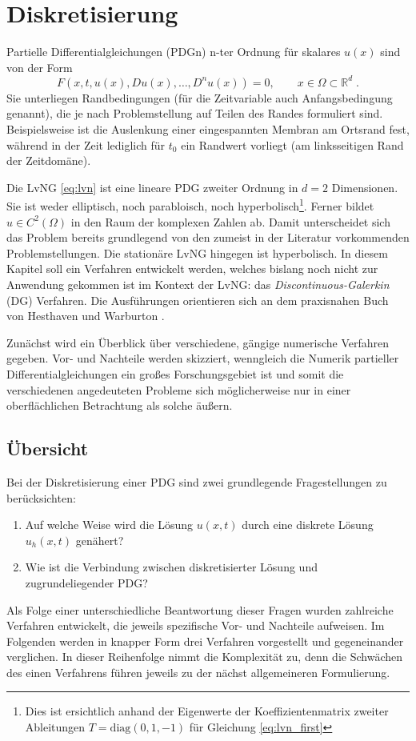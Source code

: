 \chapter{Diskretisierung}

Partielle Differentialgleichungen (PDGn) n-ter Ordnung für skalares $u(x)$ sind von der Form
\begin{equation}
  F(x, t, u(x), Du(x), \dots, D^nu(x))=0, \qquad x\in\Omega\subset\mathbb{R}^d \; .
\end{equation}
Sie unterliegen Randbedingungen (für die Zeitvariable auch Anfangsbedingung genannt), die je nach Problemstellung auf Teilen des Randes formuliert sind. Beispielsweise ist die Auslenkung einer eingespannten Membran am Ortsrand fest, während in der Zeit lediglich für $t_0$ ein Randwert vorliegt (am linksseitigen Rand der Zeitdomäne).

Die LvNG \eqref{eq:lvn} ist eine lineare PDG zweiter Ordnung in $d=2$ Dimensionen. Sie ist weder elliptisch, noch parabloisch, noch hyperbolisch\footnote{Dies ist ersichtlich anhand der Eigenwerte der Koeffizientenmatrix zweiter Ableitungen $T=\text{diag}(0,1,-1)$ für Gleichung \eqref{eq:lvn_first}}.
Ferner bildet $u\in C^2(\Omega)$ in den Raum der komplexen Zahlen ab. Damit unterscheidet sich das Problem bereits grundlegend von den zumeist in der Literatur vorkommenden Problemstellungen. Die stationäre LvNG hingegen ist hyperbolisch. In diesem Kapitel soll ein Verfahren entwickelt werden, welches bislang noch nicht zur Anwendung gekommen ist im Kontext der LvNG: das \emph{Discontinuous-Galerkin} (DG) Verfahren. Die Ausführungen orientieren sich an dem praxisnahen Buch von Hesthaven und Warburton \cite{buch}.

Zunächst wird ein Überblick über verschiedene, gängige numerische Verfahren gegeben. Vor- und Nachteile werden skizziert, wenngleich die Numerik partieller Differentialgleichungen ein großes Forschungsgebiet ist und somit die verschiedenen angedeuteten Probleme sich möglicherweise nur in einer oberflächlichen Betrachtung als solche äußern.

\section{Übersicht}\label{sec:Übersicht}
Bei der Diskretisierung einer PDG sind zwei grundlegende Fragestellungen zu berücksichten:
\begin{enumerate}
  \item Auf welche Weise wird die Lösung $u(x,t)$ durch eine diskrete Lösung $u_h(x,t)$ genähert?
  \item Wie ist die Verbindung zwischen diskretisierter Lösung und zugrundeliegender PDG?
\end{enumerate}
Als Folge einer unterschiedliche Beantwortung dieser Fragen wurden zahlreiche Verfahren entwickelt, die jeweils spezifische Vor- und Nachteile aufweisen. Im Folgenden werden in knapper Form drei Verfahren vorgestellt und  gegeneinander verglichen. In dieser Reihenfolge nimmt die Komplexität zu, denn die Schwächen des einen Verfahrens führen jeweils zu der nächst allgemeineren Formulierung.

